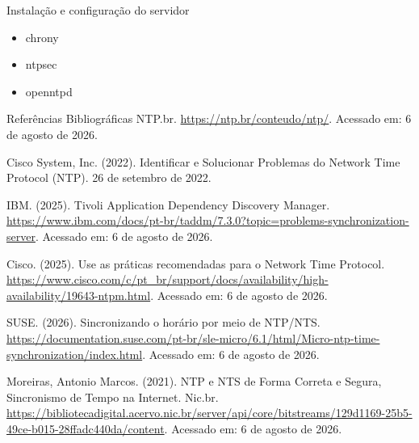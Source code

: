 \documentclass{if-beamer}
\begin{document}
	\begin{frame}{Instalação e configuração do servidor}
	\begin{itemize}
	\item chrony
	\item ntpsec
	\item openntpd
	\end{itemize}

	\end{frame}
		
		
		\begin{frame}[allowframebreaks]{Referências Bibliográficas}
	NTP.br. \url{https://ntp.br/conteudo/ntp/}. Acessado em: 6 de agosto de 2026.

	Cisco System, Inc. (2022). Identificar e Solucionar Problemas do Network Time Protocol (NTP). 26 de setembro de 2022.

	IBM. (2025). Tivoli Application Dependency Discovery Manager. \url{https://www.ibm.com/docs/pt-br/taddm/7.3.0?topic=problems-synchronization-server}. Acessado em: 6 de agosto de 2026.

	Cisco. (2025). Use as práticas recomendadas para o Network Time Protocol. \url{https://www.cisco.com/c/pt_br/support/docs/availability/high-availability/19643-ntpm.html}. Acessado em: 6 de agosto de 2026.

	SUSE. (2026). Sincronizando o horário por meio de NTP/NTS. \url{https://documentation.suse.com/pt-br/sle-micro/6.1/html/Micro-ntp-time-synchronization/index.html}. Acessado em: 6 de agosto de 2026.

	Moreiras, Antonio Marcos. (2021). NTP e NTS de Forma Correta e Segura, Sincronismo de Tempo na Internet. Nic.br. \url{https://bibliotecadigital.acervo.nic.br/server/api/core/bitstreams/129d1169-25b5-49ce-b015-28ffadc440da/content}. Acessado em: 6 de agosto de 2026.
		\end{frame}	
		
	
\end{document}
